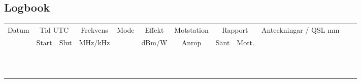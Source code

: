\begin{landscape}
\section{Logbook}
\begin{longtable}{|c|c|c|c|c|c|c|c|c|c|c|c|}
\hline
Datum & \multicolumn{2}{|c|}{Tid UTC} & Frekvens & Mode    & Effekt & Motstation & \multicolumn{2}{|c|}{Rapport} & Anteckningar / QSL mm \\
      & Start                         & Slut     & MHz/kHz &        & dBm/W      & Anrop                         & Sänt & Mott. &        \\ \hline \endhead
      &                               &          &         &        &            &                               &      &       &        \\ \hline
      &                               &          &         &        &            &                               &      &       &        \\ \hline
      &                               &          &         &        &            &                               &      &       &        \\ \hline
      &                               &          &         &        &            &                               &      &       &        \\ \hline
      &                               &          &         &        &            &                               &      &       &        \\ \hline
      &                               &          &         &        &            &                               &      &       &        \\ \hline
      &                               &          &         &        &            &                               &      &       &        \\ \hline
      &                               &          &         &        &            &                               &      &       &        \\ \hline
      &                               &          &         &        &            &                               &      &       &        \\ \hline
      &                               &          &         &        &            &                               &      &       &        \\ \hline
      &                               &          &         &        &            &                               &      &       &        \\ \hline

\end{longtable}
\end{landscape}

